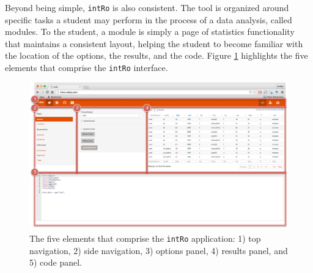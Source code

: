 \documentclass[12pt,]{article}
\begin{document}
Beyond being simple, \texttt{intRo} is also consistent. The tool is
organized around specific tasks a student may perform in the process of
a data analysis, called modules. To the student, a module is simply a
page of statistics functionality that maintains a consistent layout,
helping the student to become familiar with the location of the options,
the results, and the code. Figure \ref{fig:ui} highlights the five
elements that comprise the \texttt{intRo} interface.

\begin{figure}[ht!]
\centering
\includegraphics[width=\linewidth]{ui_annotate.pdf}
\caption{The five elements that comprise the \texttt{intRo} application: 1) top navigation, 2) side navigation, 3) options panel, 4) results panel, and 5) code panel.}
\label{fig:ui}
\end{figure}
\end{document}
